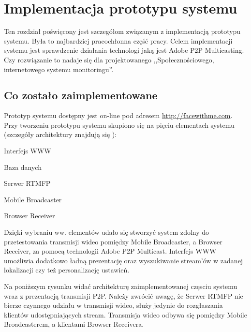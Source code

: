 \chapter{Implementacja prototypu systemu}
\label{cha:ImplementacjaPrototypu}

Ten rozdział poświęcony jest szczegółom związanym z implementacją prototypu systemu. Była to najbardziej pracochłonna część pracy. Celem implementacji systemu jest sprawdzenie działania technologi jaką jest Adobe P2P Multicasting. Czy rozwiązanie to nadaje się dla projektowanego ,,Społecznościowego, internetowego systemu monitoringu''.

\section{Co zostało zaimplementowane}
Prototyp systemu dostępny jest on-line pod adresem \url{http://facewithme.com}. Przy tworzeniu prototypu systemu skupiono się na pięciu elementach systemu (szczegóły architektury znajdują się ):

\begin{packed_item}
    \item{Interfejs WWW}
    \item{Baza danych}
    \item{Serwer RTMFP}
    \item{Mobile Broadcaster}
    \item{Browser Receiver}
\end{packed_item}

Dzięki wybraniu ww. elementów udało się stworzyć system zdolny do przetestowania transmisji wideo pomiędzy Mobile Broadcaster, a Browser Receiver, za pomocą technologii Adobe P2P Multicast. Interfejs WWW umożliwia dodatkowo ładną prezentację oraz wyszukiwanie stream'ów w zadanej lokalizacji czy też personalizację ustawień.

Na poniższym rysunku widać architekturę  zaimplementowanej częsciu systemu wraz z prezentacją transmisji P2P. Należy zwrócić uwagę, że Serwer RTMFP nie bierze czynnego udziału w transmisji wideo, służy jedynie do rozgłaszania klientów udostępniających stream. Transmisja wideo odbywa się pomiędzy Mobile Broadcasterem, a klientami Browser Receivera.

